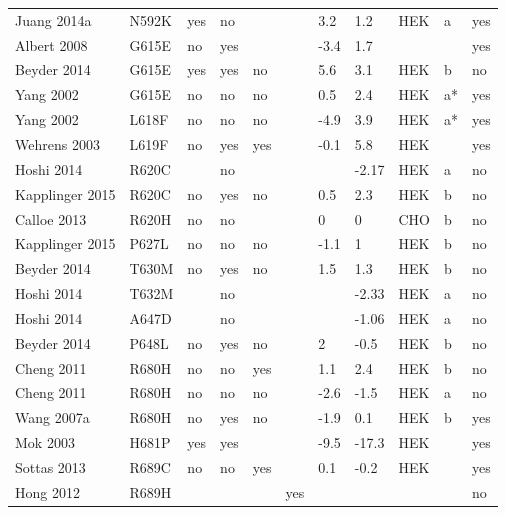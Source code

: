 \begin{tiny}
\begin{longtable}{p{4cm}|l|llll|ll|lll}
Juang 2014a\cite{Juang2014aMutationDB} & N592K & yes & no &  &  & 3.2 & 1.2 & HEK & a & yes \\
Albert 2008\cite{Albert2008MutationDB} & G615E & no & yes &  &  & -3.4 & 1.7 &  &  & yes \\
Beyder 2014\cite{Beyder2014MutationDB} & G615E & yes & yes & no &  & 5.6 & 3.1 & HEK & b & no \\
Yang 2002\cite{Yang2002MutationDB} & G615E & no & no & no &  & 0.5 & 2.4 & HEK & a* & yes \\
Yang 2002\cite{Yang2002MutationDB} & L618F & no & no & no &  & -4.9 & 3.9 & HEK & a* & yes \\
Wehrens 2003\cite{Wehrens2003MutationDB} & L619F & no & yes & yes &  & -0.1 & 5.8 & HEK &  & yes \\
Hoshi 2014\cite{Hoshi2014MutationDB} & R620C &  & no &  &  &  & -2.17 & HEK & a & no \\
Kapplinger 2015\cite{Kapplinger2015MutationDB} & R620C & no & yes & no &  & 0.5 & 2.3 & HEK & b & no \\
Calloe 2013\cite{Calloe2013MutationDB} & R620H & no & no &  &  & 0 & 0 & CHO & b & no \\
Kapplinger 2015\cite{Kapplinger2015MutationDB} & P627L & no & no & no &  & -1.1 & 1 & HEK & b & no \\
Beyder 2014\cite{Beyder2014MutationDB} & T630M & no & yes & no &  & 1.5 & 1.3 & HEK & b & no \\
Hoshi 2014\cite{Hoshi2014MutationDB} & T632M &  & no &  &  &  & -2.33 & HEK & a & no \\
Hoshi 2014\cite{Hoshi2014MutationDB} & A647D &  & no &  &  &  & -1.06 & HEK & a & no \\
Beyder 2014\cite{Beyder2014MutationDB} & P648L & no & yes & no &  & 2 & -0.5 & HEK & b & no \\
Cheng 2011\cite{Cheng2011MutationDB} & R680H & no & no & yes &  & 1.1 & 2.4 & HEK & b & no \\
Cheng 2011\cite{Cheng2011MutationDB} & R680H & no & no & no &  & -2.6 & -1.5 & HEK & a & no \\
Wang 2007a\cite{Wang2007aMutationDB} & R680H & no & yes & no &  & -1.9 & 0.1 & HEK & b & yes \\
Mok 2003\cite{Mok2003MutationDB} & H681P & yes & yes &  &  & -9.5 & -17.3 & HEK &  & yes \\
Sottas 2013\cite{Sottas2013MutationDB} & R689C & no & no & yes &  & 0.1 & -0.2 & HEK &  & yes \\
Hong 2012\cite{Hong2012MutationDB} & R689H &  &  &  & yes &  &  &  &  & no \\

\end{longtable}
\end{tiny}
